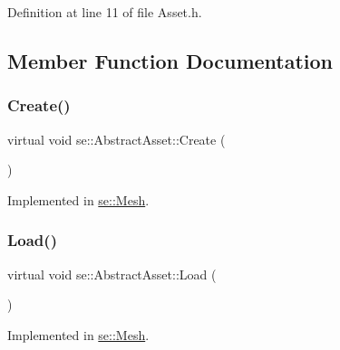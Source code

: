 Definition at line 11 of file Asset.\+h.



\subsection{Member Function Documentation}
\mbox{\label{classse_1_1_abstract_asset_ae3f9fb8f5c26ac8ea511e8e21f5bd624}} 
\subsubsection{\texorpdfstring{Create()}{Create()}}
{\footnotesize\ttfamily virtual void se\+::\+Abstract\+Asset\+::\+Create (\begin{DoxyParamCaption}{ }\end{DoxyParamCaption})\hspace{0.3cm}{\ttfamily [pure virtual]}}



Implemented in \mbox{\hyperlink{classse_1_1_mesh_a56e2d07f7b642c16e89631796a0d576e}{se\+::\+Mesh}}.

\mbox{\label{classse_1_1_abstract_asset_afb4dff418acf169d81b6ca5d8c1f6548}} 
\subsubsection{\texorpdfstring{Load()}{Load()}}
{\footnotesize\ttfamily virtual void se\+::\+Abstract\+Asset\+::\+Load (\begin{DoxyParamCaption}{ }\end{DoxyParamCaption})\hspace{0.3cm}{\ttfamily [pure virtual]}}



Implemented in \mbox{\hyperlink{classse_1_1_mesh_a17116983a6c6e73770585b72332c5140}{se\+::\+Mesh}}.

\mbox{\label{classse_1_1_abstract_asset_a1f2fdf75bbeaddec16dc4778063505b7}} 
